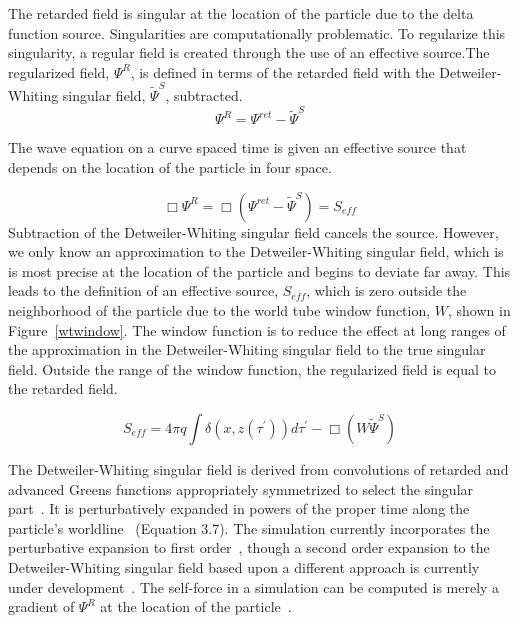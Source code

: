 The retarded field is singular at the location of the particle due to the delta function source. Singularities are computationally problematic. To regularize this singularity, a regular field is created through the use of an effective source.The regularized field, $\Psi^R$, is defined in terms of the retarded field with the Detweiler-Whiting singular field, $\tilde{\Psi}^S$, subtracted. 
\begin{equation}
\Psi^R=\Psi^{ret}-\tilde{\Psi}^S
\end{equation}


The wave equation on a curve spaced time is given an effective source that depends on the location of the particle in four space.

\begin{equation}
  \Box\Psi^R=\Box(\Psi^{ret}-\tilde{\Psi}^S)=S_{eff}
\end{equation}
Subtraction of the Detweiler-Whiting singular field cancels the source. However, we only know an approximation to the Detweiler-Whiting singular field, which is is most precise at the location of the particle and begins to deviate far away. This leads to the definition of an effective source, $S_{eff}$, which is zero outside the neighborhood of the particle due to the world tube window function, $W$, shown in Figure~\ref{wtwindow}. The window function is to reduce the effect at long ranges of the approximation in the Detweiler-Whiting singular field to the true singular field. Outside the range of the window function, the regularized field is equal to the retarded field.

\begin{equation}
S_{eff}=4\pi q\int\delta(x,z(\tau^\prime))d\tau^\prime-\Box(W\tilde{\Psi}^S)
\end{equation}

The Detweiler-Whiting singular field is derived from convolutions of retarded and advanced Greens functions appropriately symmetrized to select the singular part~\cite{detweiler_whiting}. It is perturbatively expanded in powers of the proper time along the particle's worldline~\cite{heffernan_ottewil_wardell_modesum_basisForCode} (Equation 3.7). The simulation currently incorporates the perturbative expansion to first order~\cite{heffernan_ottewil_wardell_modesum_basisForCode}, though a second order expansion to the Detweiler-Whiting singular field based upon a different approach is currently under development~\cite{pound2ndOrderSelfForce}. The self-force in a simulation can be computed is merely a gradient of $\Psi^R$ at the location of the particle~\cite{vega_wardell_diener_2011}. 



